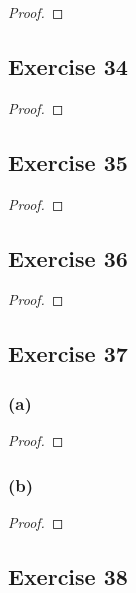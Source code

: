 \documentclass[14pt]{extarticle}
\begin{document}
\begin{proof}

\end{proof}

\subsection{Exercise 34}

\begin{proof}

\end{proof}

\subsection{Exercise 35}

\begin{proof}

\end{proof}

\subsection{Exercise 36}

\begin{proof}

\end{proof}

\subsection{Exercise 37}
\subsubsection{(a)}

\begin{proof}

\end{proof}

\subsubsection{(b)}

\begin{proof}

\end{proof}

\subsection{Exercise 38}
\end{document}
